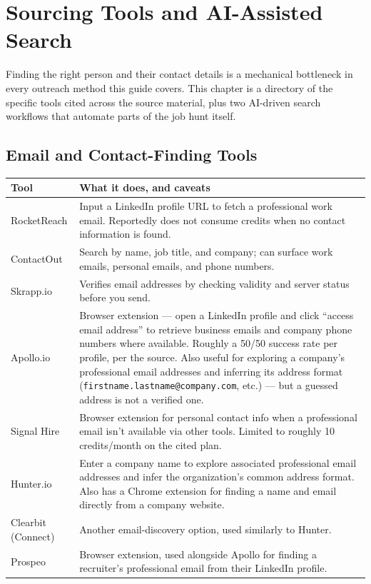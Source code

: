 \chapter{Sourcing Tools and AI-Assisted Search}
\label{ch:sourcing-tools}

Finding the right person and their contact details is a mechanical bottleneck in every outreach method this
guide covers. This chapter is a directory of the specific tools cited across the source material, plus two
AI-driven search workflows that automate parts of the job hunt itself.

\section{Email and Contact-Finding Tools}

\begin{longtable}{p{} p{}}
\toprule
\textbf{Tool} & \textbf{What it does, and caveats} \\
\midrule
\endhead
RocketReach & Input a LinkedIn profile URL to fetch a professional work email. Reportedly does not consume
credits when no contact information is found. \\
ContactOut & Search by name, job title, and company; can surface work emails, personal emails, and phone
numbers. \\
Skrapp.io & Verifies email addresses by checking validity and server status before you send. \\
Apollo.io & Browser extension — open a LinkedIn profile and click ``access email address'' to retrieve business
emails and company phone numbers where available. Roughly a 50/50 success rate per profile, per the source. Also
useful for exploring a company's professional email addresses and inferring its address format
(\texttt{firstname.lastname@company.com}, etc.) — but a guessed address is not a verified one. \\
Signal Hire & Browser extension for personal contact info when a professional email isn't available via other
tools. Limited to roughly 10 credits/month on the cited plan. \\
Hunter.io & Enter a company name to explore associated professional email addresses and infer the organization's
common address format. Also has a Chrome extension for finding a name and email directly from a company
website. \\
Clearbit (Connect) & Another email-discovery option, used similarly to Hunter. \\
Prospeo & Browser extension, used alongside Apollo for finding a recruiter's professional email from their
LinkedIn profile. \\
\bottomrule
\end{longtable}

